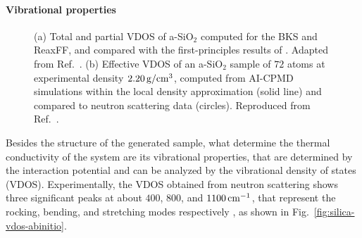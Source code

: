 \paragraph{Vibrational properties}
\begin{figure}[!tb]
    \centering
    \caption{
    (a) Total and partial VDOS of a-SiO$_2$ computed for the BKS and ReaxFF, and compared with the first-principles results of \citet{Bhattarai2016}. Adapted from Ref.~\cite{Tian2017}.
    (b) Effective VDOS of an a-SiO$_2$ sample of $72$ atoms at experimental density $2.20\,\mathrm{g/cm^3}$, computed from AI-CPMD simulations within the local density approximation (solid line) and compared to neutron scattering data (circles). Reproduced from Ref.~\cite{Sarnthein1997}.}
\end{figure}

Besides the structure of the generated sample, what determine the thermal conductivity of the system are its vibrational properties, that are determined by the interaction potential and can be analyzed by the vibrational density of states (VDOS).
Experimentally, the VDOS obtained from neutron scattering shows three significant peaks at about $400$, $800$, and $1100\,\mathrm{cm^{-1}}$, that represent the rocking, bending, and stretching modes respectively \cite{Galeener1983}, as shown in Fig.~\ref{fig:silica-vdos-abinitio}.

